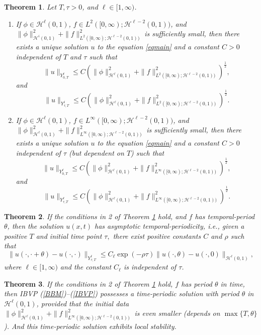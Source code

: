 \documentclass[10pt,a4paper,final]{article}
\numberwithin{equation}{section}
\newtheorem{theorem}{Theorem}[section]
\newcommand{\cH}{\mathcal{H}}
\newcommand{\Gth}{\theta}
\begin{document}
\begin{theorem}\label{th2-1}
Let $T, \tau>0$, and $\ell\in [1,\infty)$.
\begin{enumerate}
    \item If $\phi\in \cH^\ell(0,1)$, $f\in L^2([0,\infty);\cH^{\ell-2}(0,1))$, and $\|\phi\|_{\cH^i(0,1)}^2+\|f\|^2_{L^2([0,\infty);\cH^{\ell-2}(0,1))}$ is sufficiently small, then there exists a unique solution $u$ to the equation \eqref{eqmain} and a constant $C>0$ independent of $T$ and $\tau$ such that 
    $$\|u\|_{Y^{\ell}_{0,T}}\leq C(\|\phi\|_{\cH^\ell(0,1)}^2+\|f\|^2_{L^2([0,\infty);\cH^{\ell-2}(0,1))})^{\frac{1}{2}},$$
    and 
    $$\|u\|_{Y^i_{\tau,T}}\leq C(\|\phi\|_{\cH^\ell(0,1)}^2+\|f\|_{L^2([0,\infty);\cH^{\ell-2}(0,1))}^2)^{\frac{1}{2}}.$$
    \item  If $\phi\in \cH^\ell(0,1)$, $f\in L^\infty([0,\infty);\cH^{\ell-2}(0,1))$, and $\|\phi\|_{\cH^\ell(0,1)}^2+\|f\|^2_{L^\infty([0,\infty);\cH^{\ell-2}(0,1))}$ is sufficiently small, then there exists a unique solution $u$ to the equation \eqref{eqmain} and a constant $C>0$ independent of $\tau$ (but dependent on $T$) such that 
    $$\|u\|_{Y^{\ell}_{0,T}}\leq C(\|\phi\|_{\cH^\ell(0,1)}^2+\|f\|^2_{L^\infty([0,\infty);\cH^{\ell-2}(0,1))})^{\frac{1}{2}},$$
    and 
    $$\|u\|_{Y^\ell_{\tau,T}}\leq C(\|\phi\|_{\cH^\ell(0,1)}^2+\|f\|_{L^\infty([0,\infty);\cH^{\ell-2}(0,1))}^2)^{\frac{1}{2}}.$$
\end{enumerate}
\end{theorem}

\begin{theorem}\label{th2-2}
If the conditions in 2 of Theorem \ref{th2-1} hold, and $f$ has temporal-period $\theta$, then the solution $u(x,t)$ has asymptotic temporal-periodicity, i.e., given a positive $T$ and initial time point $\tau,$ there exist positive constants $C$ and $\rho$ such that 
\begin{equation}
\|u(\cdot, \cdot+\theta)-u(\cdot,\cdot)\|_{Y^{\ell}_{\tau, T}}\le C_{\ell}\exp(-\rho\tau)\|u(\cdot,\Gth)-u(\cdot,0)\|_{\cH^\ell(0,1)},
\end{equation}
where $\ell\in [1,\infty)$ and the constant $C_{\ell}$ is independent of $\tau$.
\end{theorem}

\begin{theorem}\label{th2-3}
If the conditions in 2 of Theorem \ref{th2-1} hold, $f$ has period $\theta$ in time, then IBVP (\ref{BBM})--(\ref{IBVP}) possesses a time-periodic solution with period $\theta$ in $\cH^{\ell}(0,1)$, provided that the initial data  $\|\phi\|^2_{\cH^\ell(0,1)}+\|f\|^2_{L^\infty([0,\infty);\cH^{\ell-2}(0,1))}$ is even smaller (depends on $\max\{T,\theta\}$). And this time-periodic solution exhibits local stability. \end{theorem}
\end{document}
